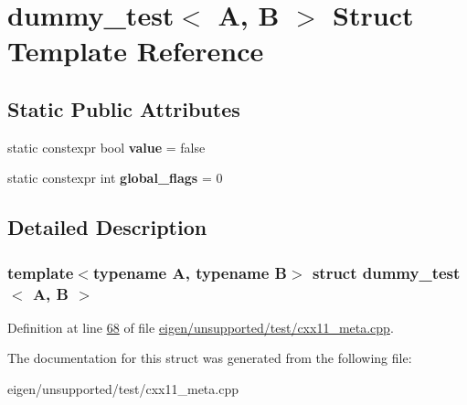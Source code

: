 \hypertarget{structdummy__test}{}\section{dummy\+\_\+test$<$ A, B $>$ Struct Template Reference}
\label{structdummy__test}
\subsection*{Static Public Attributes}
\begin{DoxyCompactItemize}
\item 
\mbox{\label{structdummy__test_a8af8889327c99c3b0ac61c916a3d68e3}} 
static constexpr bool {\bfseries value} = false
\item 
\mbox{\label{structdummy__test_a646e33a68281374d3eb03ed41343a760}} 
static constexpr int {\bfseries global\+\_\+flags} = 0
\end{DoxyCompactItemize}


\subsection{Detailed Description}
\subsubsection*{template$<$typename A, typename B$>$\newline
struct dummy\+\_\+test$<$ A, B $>$}



Definition at line \hyperlink{eigen_2unsupported_2test_2cxx11__meta_8cpp_source_l00068}{68} of file \hyperlink{eigen_2unsupported_2test_2cxx11__meta_8cpp_source}{eigen/unsupported/test/cxx11\+\_\+meta.\+cpp}.



The documentation for this struct was generated from the following file\+:\begin{DoxyCompactItemize}
\item 
eigen/unsupported/test/cxx11\+\_\+meta.\+cpp\end{DoxyCompactItemize}
